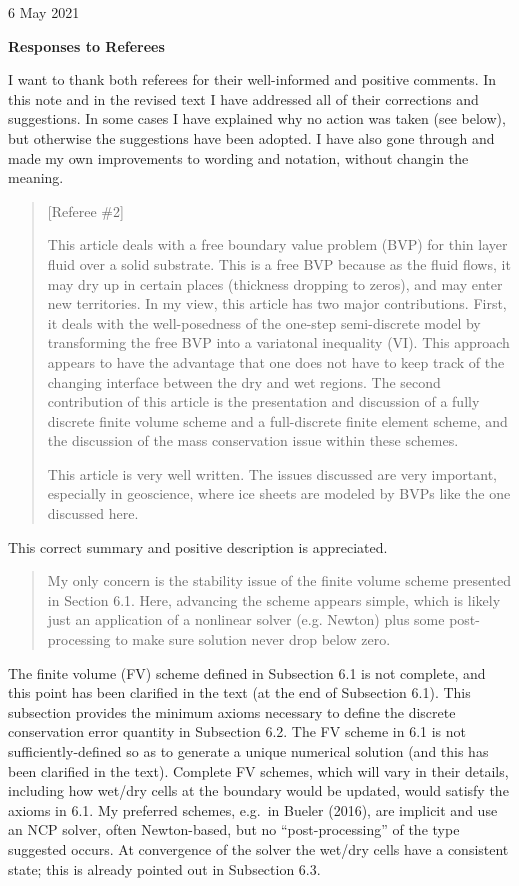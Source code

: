 \documentclass[12pt]{amsart}
\newcommand{\mm}{\medskip \noindent}
\begin{document}
\hfill 6 May 2021

\bigskip

\large\centerline{\textbf{Responses to Referees}}
\bigskip
\normalsize

\thispagestyle{empty}

I want to thank both referees for their well-informed and positive comments.  In this note and in the revised text I have addressed all of their corrections and suggestions.  In some cases I have explained why no action was taken (see below), but otherwise the suggestions have been adopted.  I have also gone through and made my own improvements to wording and notation, without changin the meaning.

\begin{quote}
[Referee \#2]

This article deals with a free boundary value problem (BVP) for thin layer fluid over a solid substrate.  This is a free BVP because as the fluid flows, it may dry up in certain places (thickness dropping to zeros), and may enter new territories.  In my view, this article has two major contributions.  First, it deals with the well-posedness of the one-step semi-discrete model by transforming the free BVP into a variatonal inequality (VI).  This approach appears to have the advantage that one does not have to keep track of the changing interface between the dry and wet regions.  The second contribution of this article is the presentation and discussion of a fully discrete finite volume scheme and a full-discrete finite element scheme, and the discussion of the mass conservation issue within these schemes.

\mm This article is very well written.  The issues discussed are very important, especially in geoscience, where ice sheets are modeled by BVPs like the one discussed here.  
\end{quote}

This correct summary and positive description is appreciated.

\begin{quote}
My only concern is the stability issue of the finite volume scheme presented in Section 6.1. Here, advancing the scheme appears simple, which is likely just an application of a nonlinear solver (e.g. Newton) plus some post-processing to make sure solution never drop below zero.
\end{quote}

The finite volume (FV) scheme defined in Subsection 6.1 is not complete, and this point has been clarified in the text (at the end of Subsection 6.1).  This subsection provides the minimum axioms necessary to define the discrete conservation error quantity in Subsection 6.2.  The FV scheme in 6.1 is not sufficiently-defined so as to generate a unique numerical solution (and this has been clarified in the text).  Complete FV schemes, which will vary in their details, including how wet/dry cells at the boundary would be updated, would satisfy the axioms in 6.1.  My preferred schemes, e.g.~in Bueler (2016), are implicit and use an NCP solver, often Newton-based, but no ``post-processing'' of the type suggested occurs.  At convergence of the solver the wet/dry cells have a consistent state; this is already pointed out in Subsection 6.3.
\end{document}
